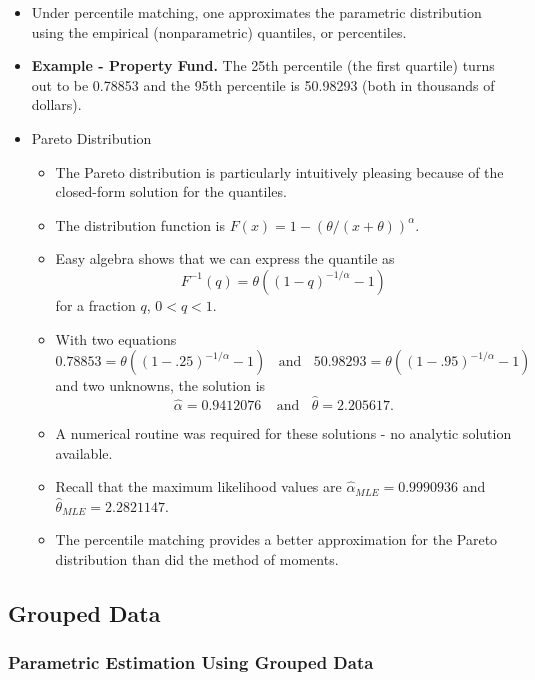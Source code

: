 \documentclass[]{book}
\begin{document}
\begin{itemize}
\item
  Under percentile matching, one approximates the parametric
  distribution using the empirical (nonparametric) quantiles, or
  percentiles.
\item
  \textbf{Example - Property Fund.} The 25th percentile (the first
  quartile) turns out to be 0.78853 and the 95th percentile is 50.98293
  (both in thousands of dollars).
\item
  Pareto Distribution

  \begin{itemize}
  \item
    The Pareto distribution is particularly intuitively pleasing because
    of the closed-form solution for the quantiles.
  \item
    The distribution function is
    \(F(x) = 1 - \left(\theta/(x+\theta )\right)^{\alpha}\).
  \item
    Easy algebra shows that we can express the quantile as
    \[F^{-1}(q) = \theta \left( (1-q)^{-1/\alpha} -1 \right)\] for a
    fraction \(q\), \(0<q<1\).
  \item
    With two equations
    \[0.78853 = \theta \left( (1-.25)^{-1/\alpha} -1 \right) \ \ \ \ \text{and} \ \ \ \ 50.98293 = \theta \left( (1-.95)^{-1/\alpha} -1\right)\]
    and two unknowns, the solution is \[
    \hat{\alpha} = 0.9412076 \ \ \ \ \ \text{and} \ \ \ \
    \hat{\theta} = 2.205617 .\]
  \item
    A numerical routine was required for these solutions - no analytic
    solution available.
  \item
    Recall that the maximum likelihood values are
    \(\hat{\alpha}_{MLE} = 0.9990936\) and
    \(\hat{\theta}_{MLE} = 2.2821147\).
  \item
    The percentile matching provides a better approximation for the
    Pareto distribution than did the method of moments.
  \end{itemize}
\end{itemize}

\subsection{Grouped Data}\label{grouped-data-2}

\subsubsection{Parametric Estimation Using Grouped
Data}\label{parametric-estimation-using-grouped-data}
\end{document}
